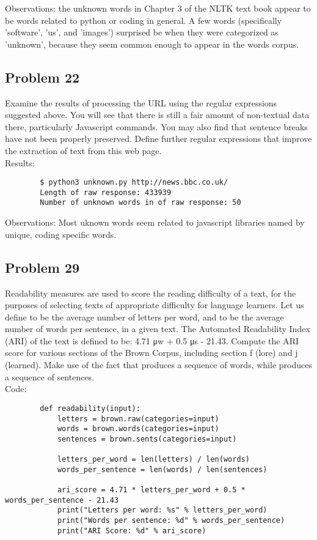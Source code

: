 \documentclass[12pt]{article}
\begin{document}
		Observations: the unknown words in Chapter 3 of the NLTK text book appear to be words related to python or coding in general. A few words (specifically 'software', 'us', and 'images') surprised be when they were categorized as 'unknown', because they seem common enough to appear in the words corpus.
		
		\subsection*{Problem 22}
		Examine the results of processing the URL  using the regular expressions suggested above. You will see that there is still a fair amount of non-textual data there, particularly Javascript commands. You may also find that sentence breaks have not been properly preserved. Define further regular expressions that improve the extraction of text from this web page.\\
		
		Results:
		\begin{lstlisting}
		$ python3 unknown.py http://news.bbc.co.uk/
		Length of raw response: 433939
		Number of unknown words in of raw response: 50
		\end{lstlisting}
		
		Observations: Most uknown words seem related to javascript libraries named by unique, coding specific words.
		
		
		\subsection*{Problem 29}
		Readability measures are used to score the reading difficulty of a text, for the purposes of selecting texts of appropriate difficulty for language learners. Let us define  to be the average number of letters per word, and  to be the average number of words per sentence, in a given text. The Automated Readability Index (ARI) of the text is defined to be: 4.71 μw + 0.5 μs - 21.43. Compute the ARI score for various sections of the Brown Corpus, including section f (lore) and j (learned). Make use of the fact that  produces a sequence of words, while  produces a sequence of sentences.\\
		
		Code:\\
		\begin{lstlisting}
		def readability(input):
			letters = brown.raw(categories=input)
			words = brown.words(categories=input)
			sentences = brown.sents(categories=input)
			
			letters_per_word = len(letters) / len(words)
			words_per_sentence = len(words) / len(sentences)
			
			ari_score = 4.71 * letters_per_word + 0.5 * words_per_sentence - 21.43
			print("Letters per word: %s" % letters_per_word)
			print("Words per sentence: %d" % words_per_sentence)
			print("ARI Score: %d" % ari_score)
		\end{lstlisting}
		
\end{document}
